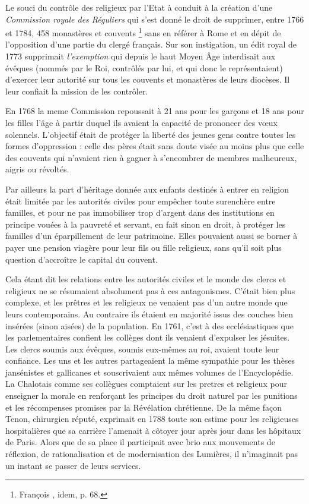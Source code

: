 Le souci du contrôle des religieux par l'Etat à conduit à la création d'une \emph{Commission royale des Réguliers} qui s'est donné le droit de supprimer, entre 1766 et 1784, 458 monastères et couvents%
\footnote{François , idem, p. 68.} 
sans en référer à Rome et en dépit de l'opposition d'une partie du clergé français. Sur son instigation, un édit royal de 1773 supprimait \emph{l'exemption} qui depuis le haut Moyen Âge interdisait aux évêques (nommés par le Roi, contrôlés par lui, et qui donc le représentaient) d'exercer leur autorité sur tous les couvents et monastères de leurs diocèses. Il leur confiait la mission de les contrôler. 

 En 1768 la meme Commission repoussait à 21 ans pour les garçons et 18 ans pour les filles l'âge à partir duquel ils avaient la capacité de prononcer des vœux solennels. L'objectif était de protéger la liberté des jeunes gens contre toutes les formes d'oppression : celle des pères était sans doute visée au moins plus que celle des couvents qui n'avaient rien à gagner à s'encombrer de membres malheureux, aigris ou révoltés.

 Par ailleurs la part d'héritage donnée aux enfants destinés à entrer en religion était limitée par les autorités civiles pour empêcher toute surenchère entre familles, et pour ne pas immobiliser trop d'argent dans des institutions en principe vouées à la pauvreté et servant, en fait sinon en droit, à protéger les familles d'un éparpillement de leur patrimoine. Elles pouvaient aussi se borner à payer une pension viagère pour leur fils ou fille religieux, sans qu'il soit plus question d'accroître le capital du couvent.

 Cela étant dit les relations entre les autorités civiles et le monde des clercs et religieux ne se résumaient absolument pas à ces antagonismes. C'était bien plus complexe, et les prêtres et les religieux ne venaient pas d'un autre monde que leurs contemporains. Au contraire ils étaient en majorité issus des couches bien insérées (sinon aisées) de la population. En 1761, c'est à des ecclésiastiques que les parlementaires confient les collèges dont ils venaient d'expulser les jésuites. Les clercs soumis aux évêques, soumis eux-mêmes au roi, avaient toute leur confiance. Les uns et les autres partageaient la même sympathie pour les thèses jansénistes et gallicanes et souscrivaient aux mêmes volumes de l'Encyclopédie. La Chalotais comme ses collègues comptaient sur les pretres et religieux pour enseigner la morale en renforçant les principes du droit naturel par les punitions et les récompenses promises par la Révélation chrétienne. De la même façon Tenon, chirurgien réputé, exprimait en 1788 toute son estime pour les religieuses hospitalières que sa carrière l'amenait à côtoyer jour après jour dans les hôpitaux de Paris. Alors que de sa place il participait avec brio aux mouvements de réflexion, de rationalisation et de modernisation des Lumières, il n'imaginait pas un instant se passer de leurs services. 


